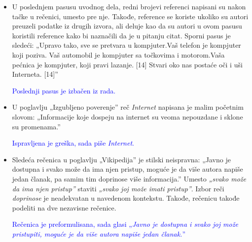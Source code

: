\documentclass[a4paper]{report}
\newcommand{\odgovor}[1]{\textcolor{blue}{#1}}
\begin{document}
\begin{itemize}
    \item U poslednjem pasusu uvodnog dela, redni brojevi referenci napisani su nakon tačke u rečenici, umesto pre nje. Takođe, reference se koriste ukoliko su autori preuzeli podatke iz drugih izvora, ali deluje kao da su autori u ovom pasusu koristili reference kako bi naznačili da je u pitanju citat. Sporni pasus je sledeći: \newline
    „Upravo tako, sve se pretvara u kompjuter.Vaš telefon je kompjuter koji poziva. Vaš automobil je kompjuter sa točkovima i motorom.Vaša pećnica je kompjuter, koji pravi lazanje. [14] Stvari oko nas postaće oči i uši Interneta. [14]”
    
    \odgovor{Poslednji pasus je izbačen iz rada.}
    
    
\end{itemize}
\begin{itemize}
    \item U poglavlju „Izgubljeno poverenje” reč \textit{Internet} napisana je malim početnim slovom:\newline
    „Informacije koje dospeju na internet su veoma nepouzdane i sklone su promenama.”
   
    \odgovor{Ispravljena je greška, sada piše \textit{Internet}.}
\end{itemize}
\begin{itemize}
    \item  Sledeća rečenica u poglavlju „Vikipedija” je stilski neispravna:\newline
    „Javno je dostupna i svako može da ima njen pristup, moguće je da više autora napiše jedan članak, pa samim tim doprinose više informacija.”\newline
    Umesto \textit{„svako može da ima njen pristup”} staviti \textit{„svako joj može imati pristup”}. Izbor reči \textit{doprinose} je neadekvatan u navedenom kontekstu. Takođe, rečenicu takođe podeliti na dve nezavisne rečenice.
    
    \odgovor{Rečenica je preformulisana, sada glasi „\textit{Javno je dostupna i svako joj može pristupiti, moguće je da više autora napiše jedan članak.}”}
    
\end{itemize}
\end{document}

